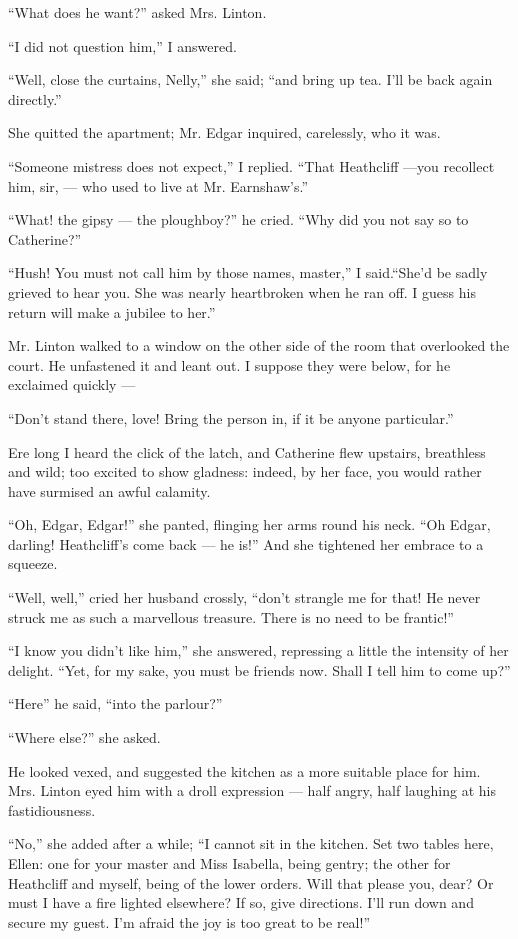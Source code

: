 \par “What does he want?” asked Mrs. Linton.
\par “I did not question him,” I answered.
\par “Well, close the curtains, Nelly,” she said; “and bring up tea. I'll be back again directly.”
\par She quitted the apartment; Mr. Edgar inquired, carelessly, who it was.
\par “Someone mistress does not expect,” I replied. “That Heathcliff —you recollect him, sir, — who used to live at Mr. Earnshaw's.”
\par “What! the gipsy — the ploughboy?” he cried. “Why did you not say so to Catherine?”
\par “Hush! You must not call him by those names, master,” I said.“She'd be sadly grieved to hear you. She was nearly heartbroken when he ran off. I guess his return will make a jubilee to her.”
\par Mr. Linton walked to a window on the other side of the room that overlooked the court. He unfastened it and leant out. I suppose they were below, for he exclaimed quickly —
\par “Don't stand there, love! Bring the person in, if it be anyone particular.”
\par Ere long I heard the click of the latch, and Catherine flew upstairs, breathless and wild; too excited to show gladness: indeed, by her face, you would rather have surmised an awful calamity.
\par “Oh, Edgar, Edgar!” she panted, flinging her arms round his neck. “Oh Edgar, darling! Heathcliff's come back — he is!” And she tightened her embrace to a squeeze.
\par “Well, well,” cried her husband crossly, “don't strangle me for that! He never struck me as such a marvellous treasure. There is no need to be frantic!”
\par “I know you didn't like him,” she answered, repressing a little the intensity of her delight. “Yet, for my sake, you must be friends now. Shall I tell him to come up?”
\par “Here” he said, “into the parlour?”
\par “Where else?” she asked.
\par He looked vexed, and suggested the kitchen as a more suitable place for him. Mrs. Linton eyed him with a droll expression — half angry, half laughing at his fastidiousness.
\par “No,” she added after a while; “I cannot sit in the kitchen. Set two tables here, Ellen: one for your master and Miss Isabella, being gentry; the other for Heathcliff and myself, being of the lower orders. Will that please you, dear? Or must I have a fire lighted elsewhere? If so, give directions. I'll run down and secure my guest. I'm afraid the joy is too great to be real!”
